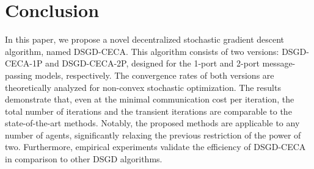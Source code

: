 \documentclass{article}
\theoremstyle{plain}
\theoremstyle{definition}
\begin{document}
\section{Conclusion}
In this paper, we propose a novel decentralized stochastic gradient descent algorithm, named DSGD-CECA. This algorithm consists of two versions: DSGD-CECA-1P and DSGD-CECA-2P, designed for the 1-port and 2-port message-passing models, respectively. The convergence rates of both versions are theoretically analyzed for non-convex stochastic optimization. The results demonstrate that, even at the minimal communication cost per iteration, the total number of iterations and the transient iterations are comparable to the state-of-the-art methods. Notably, the proposed methods are applicable to any number of agents, significantly relaxing the previous restriction of the power of two. Furthermore, empirical experiments validate the efficiency of DSGD-CECA in comparison to other DSGD algorithms.








\newpage
\appendix
\onecolumn
\end{document}
